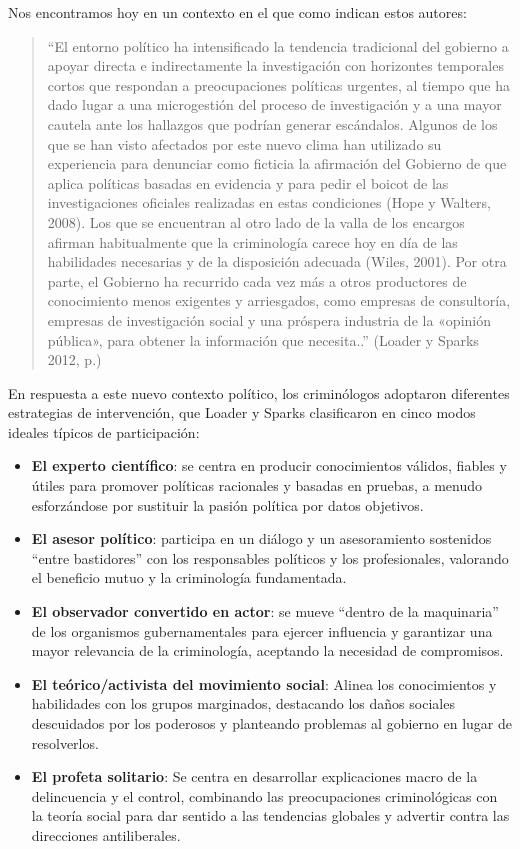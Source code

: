 \documentclass[
  spanish,
  letterpaper,
  DIV=11,
  numbers=noendperiod]{scrreprt}
\begin{document}
Nos encontramos hoy en un contexto en el que como indican estos autores:

\begin{quote}
``El entorno político ha intensificado la tendencia tradicional del
gobierno a apoyar directa e indirectamente la investigación con
horizontes temporales cortos que respondan a preocupaciones políticas
urgentes, al tiempo que ha dado lugar a una microgestión del proceso de
investigación y a una mayor cautela ante los hallazgos que podrían
generar escándalos. Algunos de los que se han visto afectados por este
nuevo clima han utilizado su experiencia para denunciar como ficticia la
afirmación del Gobierno de que aplica políticas basadas en evidencia y
para pedir el boicot de las investigaciones oficiales realizadas en
estas condiciones (Hope y Walters, 2008). Los que se encuentran al otro
lado de la valla de los encargos afirman habitualmente que la
criminología carece hoy en día de las habilidades necesarias y de la
disposición adecuada (Wiles, 2001). Por otra parte, el Gobierno ha
recurrido cada vez más a otros productores de conocimiento menos
exigentes y arriesgados, como empresas de consultoría, empresas de
investigación social y una próspera industria de la «opinión pública»,
para obtener la información que necesita..'' (Loader y Sparks 2012, p.)
\end{quote}

En respuesta a este nuevo contexto político, los criminólogos adoptaron
diferentes estrategias de intervención, que Loader y Sparks clasificaron
en cinco modos ideales típicos de participación:

\begin{itemize}
\item
  \textbf{El experto científico}: se centra en producir conocimientos
  válidos, fiables y útiles para promover políticas racionales y basadas
  en pruebas, a menudo esforzándose por sustituir la pasión política por
  datos objetivos.
\item
  \textbf{El asesor político}: participa en un diálogo y un
  asesoramiento sostenidos ``entre bastidores'' con los responsables
  políticos y los profesionales, valorando el beneficio mutuo y la
  criminología fundamentada.
\item
  \textbf{El observador convertido en actor}: se mueve ``dentro de la
  maquinaria'' de los organismos gubernamentales para ejercer influencia
  y garantizar una mayor relevancia de la criminología, aceptando la
  necesidad de compromisos.
\item
  \textbf{El teórico/activista del movimiento social}: Alinea los
  conocimientos y habilidades con los grupos marginados, destacando los
  daños sociales descuidados por los poderosos y planteando problemas al
  gobierno en lugar de resolverlos.
\item
  \textbf{El profeta solitario}: Se centra en desarrollar explicaciones
  macro de la delincuencia y el control, combinando las preocupaciones
  criminológicas con la teoría social para dar sentido a las tendencias
  globales y advertir contra las direcciones antiliberales.
\end{itemize}
\end{document}
